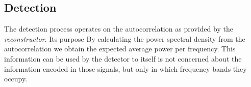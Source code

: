 \documentclass[a4paper, openany, oneside]{memoir}
\begin{document}
\subsection{Detection}
The detection process operates on the autocorrelation as provided by the \emph{reconstructor}. Its purpose By calculating the power spectral density from the autocorrelation we obtain the expected average power per frequency. This information can be used by the detector to itself is not concerned about the information encoded in those signals, but only in which frequency bands they occupy. 
\end{document}
